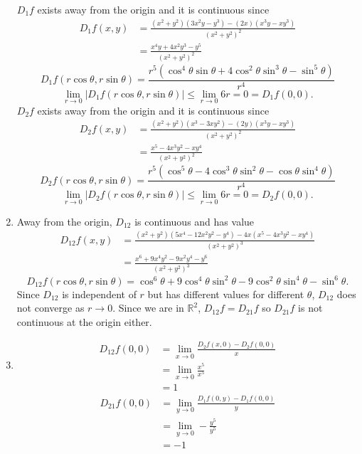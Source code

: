 \documentclass{article}
\begin{document}
\begin{enumerate}
  $D_1 f$ exists away from the origin and it is continuous since
  \begin{align*}
    D_1 f(x,y) &= \frac{(x^2+y^2)(3x^2y - y^3) - (2x)(x^3y - xy^3)}{(x^2+y^2)^2} \\
    &= \frac{x^4y + 4x^2y^3 - y^5}{(x^2+y^2)^2}
  \end{align*}
  \[
    D_1 f(r\cos \theta,r\sin \theta) = \frac{r^5(\cos^4 \theta \sin \theta + 4\cos^2 \theta \sin^3 \theta - \sin^5 \theta)}{r^4}
  \]
  \[
    \lim_{r \to 0} |D_1 f(r\cos \theta, r\sin \theta)| 
    \leq \lim_{r \to 0}  6r
    = 0 = D_1 f(0,0).
  \]
  $D_2 f$ exists away from the origin and it is continuous since
  \begin{align*}
    D_2 f(x,y) &= \frac{(x^2+y^2)(x^3-3xy^2) - (2y)(x^3y - xy^3)}{(x^2+y^2)^2} \\
    &= \frac{x^5 -4x^3y^2 - xy^4}{(x^2+y^2)^2}
  \end{align*}
  \[
    D_2 f(r\cos \theta,r\sin \theta) = \frac{r^5(\cos^5 \theta - 4\cos^3 \theta \sin^2 \theta - \cos \theta \sin^4 \theta)}{r^4}
  \]
  \[
    \lim_{r \to 0} |D_2 f(r\cos \theta, r\sin \theta)| 
    \leq \lim_{r \to 0}  6r
    = 0 = D_2 f(0,0).
  \]
  \item Away from the origin, $D_{1 2}$ is continuous and has value
  \begin{align*}
    D_{1 2} f(x, y) &= \frac{(x^2+y^2)(5x^4 -12x^2y^2 - y^4) - 4x(x^5 -4x^3y^2 - xy^4)}{(x^2+y^2)^3} \\
    &= \frac{x^6 + 9x^4y^2 - 9x^2y^4 - y^6}{(x^2+y^2)^3}
  \end{align*}
  \[
    D_{1 2} f(r\cos \theta, r\sin \theta) 
    = \cos^6 \theta + 9\cos^4 \theta \sin^2 \theta - 9\cos^2 \theta \sin^4 \theta - \sin^6 \theta.
  \]
  Since $D_{1 2}$ is independent of $r$ but has different values for different $\theta$,
  $D_{1 2}$ does not converge as $r \to 0$.
  Since we are in $\mathbb{R}^2$, $D_{1 2} f = D_{2 1} f$ so $D_{2 1} f$
  is not continuous at the origin either.
  \item 
  \begin{align*}
    D_{1 2} f(0,0) &= \lim_{x \to 0} \frac{D_2 f(x,0) - D_2 f(0,0)}{x} \\
    &= \lim_{x \to 0} \frac{x^5}{x^5} \\
    &= 1
  \end{align*}
  \begin{align*}
    D_{2 1} f(0,0) &= \lim_{y \to 0} \frac{D_1 f(0,y) - D_1 f(0,0)}{y} \\
    &= \lim_{y \to 0} -\frac{y^5}{y^5} \\
    &= -1
  \end{align*}
\end{enumerate}
\newpage 
\end{document}
